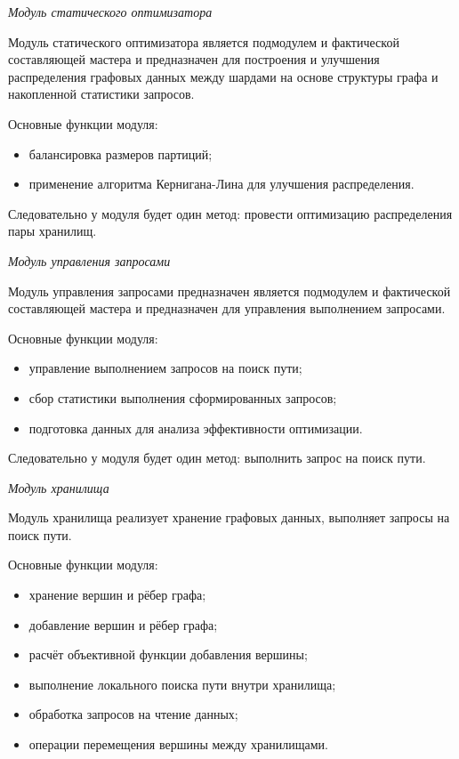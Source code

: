 \textit{Модуль статического оптимизатора}

Модуль статического оптимизатора является подмодулем и фактической составляющей мастера и предназначен для построения и улучшения распределения графовых данных между шардами на основе структуры графа и накопленной статистики запросов.

Основные функции модуля:

\begin{itemize}
    \item балансировка размеров партиций;
    \item применение алгоритма Кернигана-Лина для улучшения распределения.
\end{itemize}

Следовательно у модуля будет один метод: провести оптимизацию распределения пары хранилищ.

\textit{Модуль управления запросами}

Модуль управления запросами предназначен является подмодулем и фактической составляющей мастера и предназначен для управления выполнением запросами.

Основные функции модуля:

\begin{itemize}
    \item управление выполнением запросов на поиск пути;
    \item сбор статистики выполнения сформированных запросов;
    \item подготовка данных для анализа эффективности оптимизации.
\end{itemize}

Следовательно у модуля будет один метод: выполнить запрос на поиск пути.

\textit{Модуль хранилища}

Модуль хранилища реализует хранение графовых данных, выполняет запросы на поиск пути.

Основные функции модуля:

\begin{itemize}
    \item хранение вершин и рёбер графа;
    \item добавление вершин и рёбер графа;
    \item расчёт объективной функции добавления вершины;
    \item выполнение локального поиска пути внутри хранилища;
    \item обработка запросов на чтение данных;
    \item операции перемещения вершины между хранилищами.
\end{itemize}


